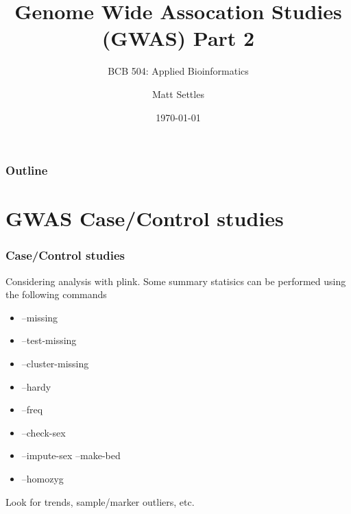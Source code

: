 \documentclass[pdf]{beamer}
\begin{document}
\title[GWAS]{Genome Wide Assocation Studies (GWAS) Part 2}
\subtitle{BCB 504: Applied Bioinformatics\\}
\author[Matt Settles]{Matt Settles}
\date{\today}


\begin{frame}[plain]
  \titlepage
\end{frame}


\begin{frame}[plain] 
  \frametitle{Outline}
  \tableofcontents
\end{frame}

\section{GWAS Case/Control studies}
\begin{frame}
  \frametitle{Case/Control studies}
  Considering analysis with plink. Some summary statisics can be performed using the following commands
  \begin{itemize}
  \item --missing
  \item --test-missing
  \item --cluster-missing
  \item --hardy
  \item --freq
  \item --check-sex
  \item --impute-sex --make-bed
  \item --homozyg
  \end{itemize}
Look for trends, sample/marker outliers, etc.
\end{frame}
\end{document}
